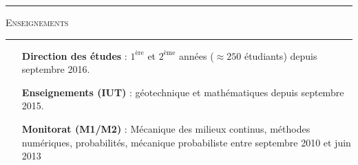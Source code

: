 \documentclass[a4paper,11pt]{article}
\newcommand{\titre}[1]{
  \begin{center}
    \rule{0.4\textwidth}{0.5pt}
    \par\vspace{0.1cm}
    \textsc{\large #1}
    \par\vspace{-0.2cm}
    \par\noindent\rule{0.4\textwidth}{0.5pt}
  \end{center}
}
\begin{document}
\titre{Enseignements}
\begin{itemize}
  \item[\bf Direction des études] : $1^\text{ère}$ et $2^\text{ème}$ années ($\approx 250$ étudiants) depuis septembre 2016.
  \item[\bf Enseignements (IUT)] : géotechnique et mathématiques depuis septembre 2015.
  \item[\bf Monitorat (M1/M2)] : Mécanique des milieux continus, méthodes numériques, probabilités, mécanique probabiliste entre septembre 2010 et juin 2013
\end{itemize}
\vfill
\empty
\end{document}
